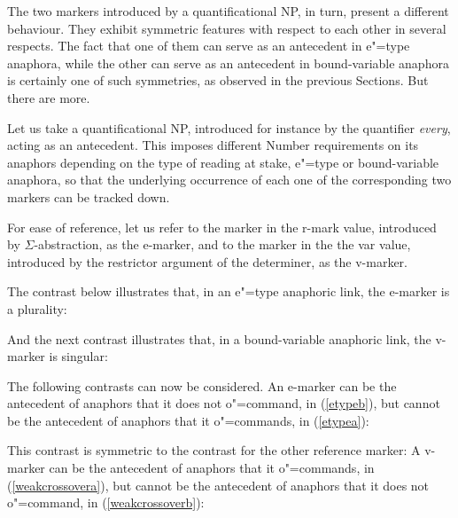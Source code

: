 \documentclass[output=paper
,modfonts
,nonflat]{langsci/langscibook}
\begin{document}
The two markers introduced by a quantificational NP,
in turn, present a 
different behaviour. They exhibit symmetric features
with respect to each other in several respects. The fact that
one of them can serve as an antecedent in e"=type anaphora, while
the other can serve as an antecedent in bound-variable anaphora is certainly
one of such symmetries, as observed in the previous Sections. But there are more.

Let us take a quantificational NP, introduced for instance by the quantifier \emph{every}, 
acting as an antecedent. This imposes
different Number requirements on its anaphors depending on the
type of reading at stake, e"=type or bound-variable anaphora, so that the
underlying occurrence of each one of the corresponding
two markers can be tracked down.

For ease of reference, let us
refer to the marker in the {\sc r-mark} value, introduced by 
\mbox{$\Sigma$-abstraction}, 
as the e-marker, and to the marker in the the {\sc var} value,
introduced by the restrictor argument of the determiner, as the v-marker.

The contrast below illustrates that, in an e"=type anaphoric link, the e-marker is a plurality:

\begin{exe}
\end{exe}

And the next contrast illustrates that, in a bound-variable anaphoric link, the v-marker is singular:

\begin{exe}
\end{exe}

The following contrasts can now be considered. An e-marker can be the
antecedent of anaphors that it does not o"=command, in (\ref{etypeb}), but
cannot be the antecedent of anaphors that it o"=commands, in (\ref{etypea}):

\begin{exe}
\ex\label{etype}
\begin{xlist}
\label{etypea}
\label{etypeb}
\end{xlist}
\end{exe}

This contrast is symmetric to the contrast for the other reference marker: A
v-marker 
can be the antecedent of anaphors that it o"=commands, in (\ref{weakcrossovera}), but
cannot be the antecedent of anaphors that it 
does not o"=command, in (\ref{weakcrossoverb}):
\end{document}
